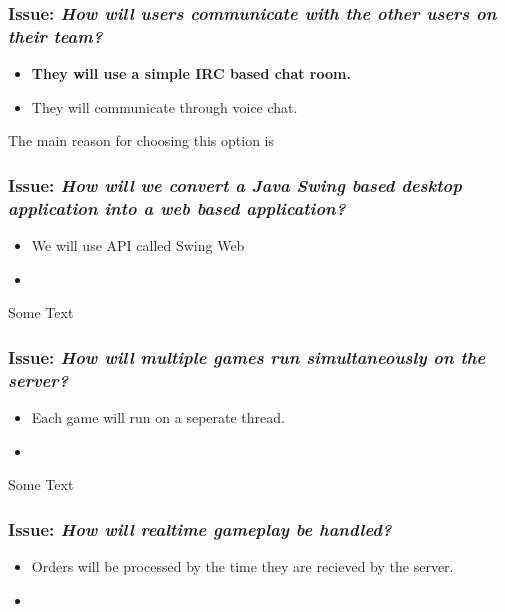 \subsubsection*{Issue: \textit{How will users communicate with the other users on their team?}}

  \begin{itemize}
    \item \textbf{They will use a simple IRC based chat room.}
    \item They will communicate through voice chat.
  \end{itemize}

The main reason for choosing this option is 

\subsubsection*{Issue: \textit{How will we convert a Java Swing based desktop application into a web based application?}}

  \begin{itemize}
    \item We will use API called Swing Web
    \item 
  \end{itemize}

Some Text

\subsubsection*{Issue: \textit{How will multiple games run simultaneously on the server?}}

  \begin{itemize}
    \item Each game will run on a seperate thread.
    \item 
  \end{itemize}

Some Text

\subsubsection*{Issue: \textit{How will realtime gameplay be handled?}}

  \begin{itemize}
    \item Orders will be processed by the time they are recieved by the server.
    \item 
  \end{itemize}

